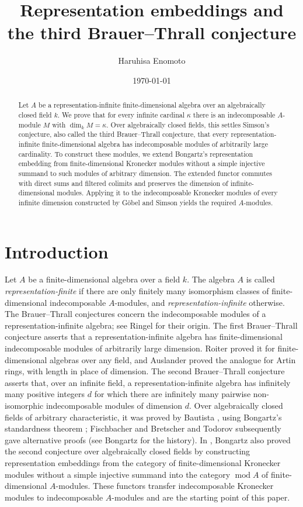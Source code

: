\documentclass[a4paper,reqno,10pt]{amsart}
\title[Representation embeddings and the third Brauer--Thrall conjecture]
{Representation embeddings and the third Brauer--Thrall conjecture}
\author[H.\ Enomoto]{Haruhisa Enomoto}
\date{\today}
\theoremstyle{definition}
\DeclareMathOperator{\md}{mod}
\numberwithin{equation}{section}
\begin{document}
\begin{abstract}
Let $A$ be a representation-infinite finite-dimensional algebra over an
algebraically closed field $k$. We prove that for every infinite cardinal
$\kappa$ there is an indecomposable $A$-module $M$ with $\dim_k M=\kappa$.
Over algebraically closed fields, this settles Simson's conjecture, also
called the third Brauer--Thrall conjecture, that every
representation-infinite finite-dimensional algebra has indecomposable
modules of arbitrarily large cardinality. To construct these modules, we
extend Bongartz's representation embedding from finite-dimensional
Kronecker modules without a simple injective summand to such modules of
arbitrary dimension. The extended
functor commutes with direct sums and filtered colimits and preserves the
dimension of infinite-dimensional modules. Applying it to the
indecomposable Kronecker modules of every infinite dimension constructed by
G\"obel and Simson yields the required $A$-modules.
\end{abstract}
\maketitle
\raggedbottom
\begingroup\small\tableofcontents\endgroup

\section{Introduction}
Let $A$ be a finite-dimensional algebra over a field $k$. The algebra $A$
is called \emph{representation-finite} if there are only finitely many
isomorphism classes of finite-dimensional indecomposable $A$-modules, and
\emph{representation-infinite} otherwise. The Brauer--Thrall conjectures
concern the indecomposable modules of a representation-infinite
algebra; see Ringel \cite{RingelReport} for their origin. The first
Brauer--Thrall conjecture asserts that a representation-infinite algebra
has finite-dimensional indecomposable modules of arbitrarily large
dimension. Roiter \cite{Roiter} proved it for finite-dimensional algebras
over any field, and Auslander \cite{AuslanderII} proved the analogue for
Artin rings, with length in place of dimension. The second Brauer--Thrall conjecture asserts that,
over an infinite field, a representation-infinite algebra has infinitely
many positive integers $d$ for which there are infinitely many pairwise
non-isomorphic indecomposable modules of dimension $d$. Over algebraically
closed fields of arbitrary characteristic, it was proved by Bautista \cite{BautistaBT2}, using
Bongartz's standardness theorem \cite{BongartzStandard};
Fischbacher \cite{Fischbacher} and Bretscher and Todorov
\cite{BretscherTodorov} subsequently gave alternative proofs (see
Bongartz \cite[\S5.1]{Bongartz} for the history). In \cite[Theorem~6]{Bongartz}, Bongartz also proved the second conjecture
over algebraically closed fields by constructing representation embeddings
from the category of finite-dimensional Kronecker modules
without a simple injective summand into the category $\md A$ of finite-dimensional $A$-modules. These functors transfer indecomposable
Kronecker modules to indecomposable $A$-modules and are the starting
point of this paper.
\end{document}
